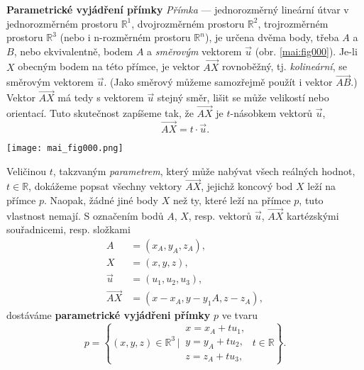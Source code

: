 \wikitextrule
\begin{example}\label{mai:exam001}
  \textbf{Parametrické vyjádření přímky}\newline\small
  \emph{Přímka} — jednorozměrný lineární útvar v jednorozměrném prostoru \(\mathbb{R}^1\), 
  dvojrozměrném prostoru \(\mathbb{R}^2\), trojrozměrném prostoru \(\mathbb{R}^3\) (nebo i 
  n-rozměrném prostoru \(\mathbb{R}^n\)), je určena dvěma body, třeba \(A\) a \(B\), nebo 
  ekvivalentně, bodem \(A\) a \emph{směrovým} vektorem \(\vec{u}\) (obr. \ref{mai:fig000}). 
  Je-li \(X\) obecným bodem na této přímce, je vektor \(\overrightarrow{AX}\) rovnoběžný, 
  tj. \emph{kolineární}, se směrovým vektorem \(\vec{u}\). (Jako směrový můžeme samozřejmě 
  použít i vektor \(\overrightarrow{AB}\).) Vektor \(\overrightarrow{AX}\) má tedy s 
  vektorem \(\vec{u}\) stejný směr, lišit se může velikostí nebo orientací. Tuto skutečnost 
  zapíšeme tak, že \(\overrightarrow{AX}\) je \(t\)-násobkem vektorů \(\vec{u}\),
  \begin{equation*}
  \overrightarrow{AX} = t \cdot \vec{u}.
  \end{equation*}
  {\centering
    \captionsetup{type=figure}
    \texttt{[image: mai\_fig000.png]}
    \par}
  Veličinou \(t\), takzvaným \emph{parametrem}, který může nabývat všech reálných hodnot, 
  \(t\in\mathbb{R}\), dokážeme popsat všechny vektory \(\overrightarrow{AX}\), jejichž 
  koncový bod \(X\) leží na přímce \(p\). Naopak, žádné jiné body \(X\) než ty, které leží na 
  přímce \(p\), tuto vlastnost nemají. S označením bodů \(A\), \(X\), resp. vektorů 
  \(\vec{u}\), \(\overrightarrow{AX}\) kartézskými souřadnicemi, resp. složkami
  \begin{align*}
                    A &= (x_A,y_A, z_A), \\ 
                    X &=(x,y,z),         \\
              \vec{u} &= (u_1,u_2,u_3),  \\ 
  \overrightarrow{AX} &= (x - x_A, y - y_1A, z-z_A),
  \end{align*}
  dostáváme \textbf{parametrické vyjádřeni přímky} \(p\) ve tvaru
  \begin{equation}\label{MAI:eq_M001}
    p = \left\{(x,y,z)\in\mathbb{R}^3\,|\,
    \begin{matrix}
      x = x_A + tu_1,        \\
      y = y_A + tu_2,        \\
     z = z_A + tu_3,
    \end{matrix}
    \;t\in\mathbb{R}
    \right\}. 
  \end{equation}
  \normalsize
\end{example}